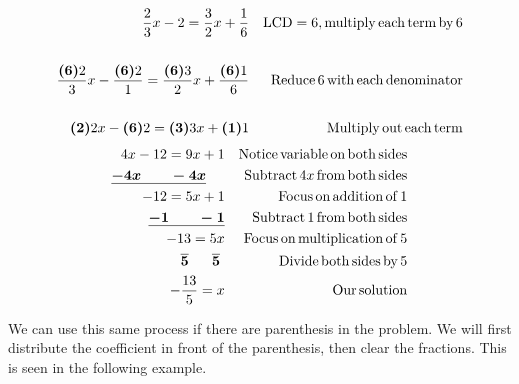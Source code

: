 \begin{example}\label{Lin31}
  
  \begin{eqnarray*}
    \frac{2}{3} x - 2 = \frac{3}{2} x + \frac{1}{6} &  & \operatorname{LCD} = 6,
    \operatorname{multiply} \operatorname{each} \operatorname{term} \operatorname{by} 6\\
    &  & \\
    \frac{\boldsymbol{(6)} 2}{3} x - \frac{\boldsymbol{(6)} 2}{1} =
    \frac{\boldsymbol{(6)} 3}{2} x + \frac{\boldsymbol{(6)} 1}{6} &  &
    \operatorname{Reduce} 6 \operatorname{with} \operatorname{each} \operatorname{denominator}\\
    &  & \\
    \boldsymbol{(2)} 2 x - \boldsymbol{(6)} 2 = \boldsymbol{(3)} 3 x +
    \boldsymbol{(1)} 1 &  & \operatorname{Multiply} \operatorname{out} \operatorname{each} \operatorname{term}
  \end{eqnarray*}
  \begin{eqnarray*}
    4 x - 12 = 9 x + 1 &  & \operatorname{Notice} \operatorname{variable} \operatorname{on}
    \operatorname{both} \operatorname{sides}\\
    \underline{\boldsymbol{- 4 x ~~~~~~- 4 x}}~~~~  &  & \operatorname{Subtract} 4 x \operatorname{from}
    \operatorname{both} \operatorname{sides}\\
    - 12 = 5 x + 1 &  & \operatorname{Focus} \operatorname{on} \operatorname{addition} \operatorname{of} 1\\
    \boldsymbol{\underline{- 1 ~~~~~~- 1}} &  & \operatorname{Subtract} 1 \operatorname{from}
    \operatorname{both} \operatorname{sides}\\
    - 13 = 5 x &  & \operatorname{Focus} \operatorname{on} \operatorname{multiplication} \operatorname{of} 5\\
    \boldsymbol{\overline{5} ~~~~~ \overline{5}}~  &  & \operatorname{Divide} \operatorname{both}
    \operatorname{sides} \operatorname{by} 5\\
    - \frac{13}{5} = x &  & \operatorname{Our} \operatorname{solution}
  \end{eqnarray*}
\end{example}

 We can use this same process if there are parenthesis in the problem. We will
first distribute the coefficient in front of the parenthesis, then clear the
fractions. This is seen in the following example.


